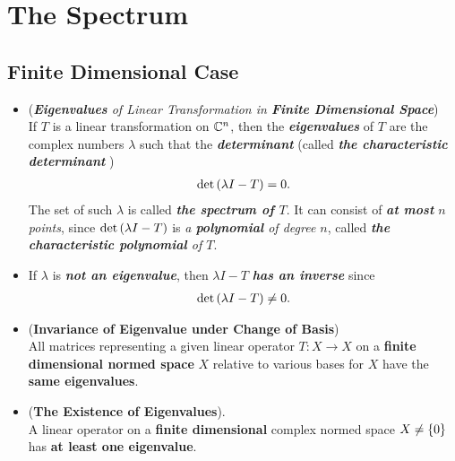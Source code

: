 \documentclass[11pt]{article}
\begin{document}
\section{The Spectrum}
\subsection{Finite Dimensional Case}
\begin{itemize}
\item \begin{remark} (\emph{\textbf{Eigenvalues} of Linear Transformation in \textbf{Finite Dimensional Space}})\\
If $Τ$ is a linear transformation on ${\mathbb C}^n$, then the \emph{\textbf{eigenvalues}} of $Τ$ are the  complex numbers $\lambda$ such that the \emph{\textbf{determinant}} (called \emph{\textbf{the characteristic determinant}} )
\begin{align*}
\det\left(\lambda I - T\right) = 0.
\end{align*} The set of such $\lambda$ is called \emph{\textbf{the spectrum of $T$}}. It can consist of \emph{\textbf{at most} $n$ points}, since $\det\left(\lambda I - T\right)$ is \emph{a \textbf{polynomial} of degree $n$}, called \emph{\textbf{the characteristic polynomial} of $T$}.
\end{remark}

\item \begin{remark}
If $\lambda$ is \emph{\textbf{not an eigenvalue}}, then $\lambda I - T$ \emph{\textbf{has an inverse}} since 
\begin{align*}
\det\left(\lambda I - T\right) \neq 0.
\end{align*} 
\end{remark}

\item \begin{proposition} (\textbf{Invariance of Eigenvalue under Change of Basis}) \citep{kreyszig1989introductory}\\
All matrices representing a given linear operator $T: X \rightarrow X$ on a \textbf{finite dimensional normed space} $X$ relative to various bases for $X$ have the \textbf{same eigenvalues}.
\end{proposition}

\item \begin{theorem} (\textbf{The Existence of Eigenvalues}).  \citep{kreyszig1989introductory}\\
A linear operator on a \textbf{finite dimensional} complex normed space $X \neq \left\{0\right\}$ has \textbf{at least one eigenvalue}.
\end{theorem}
\end{itemize}
\end{document}
